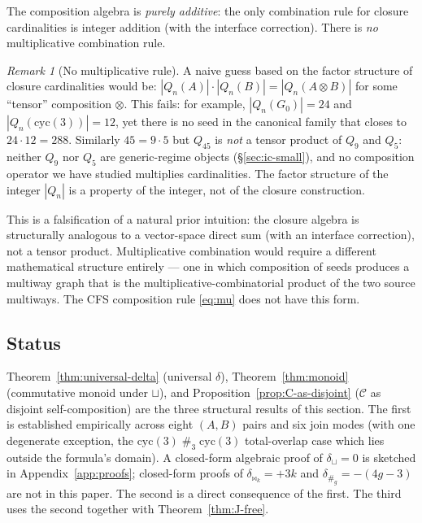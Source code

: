 \documentclass[12pt,a4paper]{article}
\theoremstyle{definition}
\theoremstyle{remark}
\newtheorem{remark}[theorem]{Remark}
\newcommand{\Qn}{Q_n}
\newcommand{\Ccls}{\mathcal{C}}             %
\newcommand{\cyc}{\mathrm{cyc}}
\newcommand{\bridge}{\mathbin{\bowtie}}     %
\newcommand{\glue}{\mathbin{\#}}            %
\begin{document}
The composition algebra is \emph{purely additive}: the only
combination rule for closure cardinalities is integer addition (with
the interface correction). There is \emph{no} multiplicative
combination rule.

\begin{remark}[No multiplicative rule]\label{rem:no-mult}
A naive guess based on the factor structure of closure cardinalities
would be: $|\Qn(A)| \cdot |\Qn(B)| = |\Qn(A \otimes B)|$ for some
``tensor'' composition $\otimes$. This fails: for example,
$|\Qn(G_0)| = 24$ and $|\Qn(\cyc(3))| = 12$, yet there is no seed
in the canonical family that closes to $24 \cdot 12 = 288$.
Similarly $45 = 9 \cdot 5$ but $Q_{45}$ is \emph{not} a tensor
product of $Q_9$ and $Q_5$: neither $Q_9$ nor $Q_5$ are
generic-regime objects (\S\ref{sec:ic-small}), and no composition
operator we have studied multiplies cardinalities. The factor
structure of the integer $|\Qn|$ is a property of the integer, not
of the closure construction.
\end{remark}

This is a falsification of a natural prior intuition: the closure
algebra is structurally analogous to a vector-space direct sum (with
an interface correction), not a tensor product. Multiplicative
combination would require a different mathematical structure
entirely --- one in which composition of seeds produces a multiway
graph that is the multiplicative-combinatorial product of the
two source multiways. The CFS composition rule
\eqref{eq:mu} does not have this form.

\subsection{Status}\label{sec:comp-status}

Theorem~\ref{thm:universal-delta} (universal $\delta$),
Theorem~\ref{thm:monoid} (commutative monoid under $\sqcup$), and
Proposition~\ref{prop:C-as-disjoint} ($\Ccls$ as disjoint
self-composition) are the three structural results of this section.
The first is established empirically across eight $(A, B)$ pairs and
six join modes (with one degenerate exception, the $\cyc(3) \glue_3
\cyc(3)$ total-overlap case which lies outside the formula's domain).
A closed-form algebraic proof of $\delta_{\sqcup} = 0$ is sketched
in Appendix~\ref{app:proofs}; closed-form proofs of $\delta_{\bridge_k}
= +3k$ and $\delta_{\glue_g} = -(4g - 3)$ are not in this paper.
The second is a direct consequence of the first. The third uses
the second together with Theorem~\ref{thm:J-free}.
\end{document}
